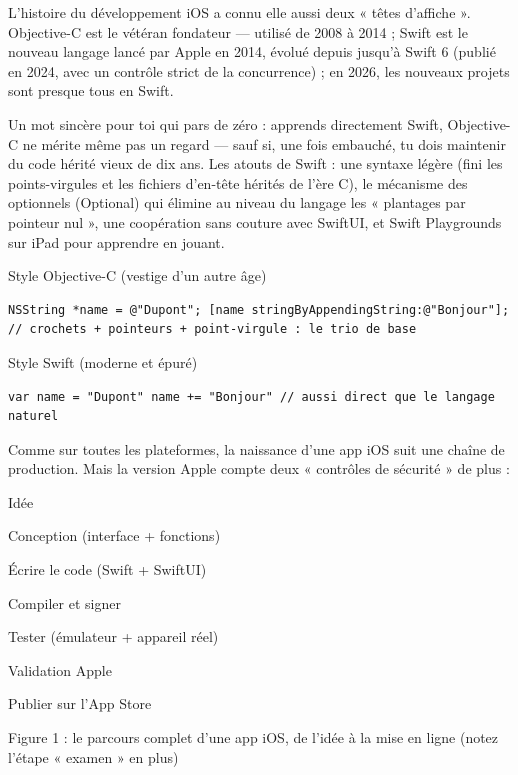 L’histoire du développement iOS a connu elle aussi deux « têtes d’affiche ». Objective-C est le vétéran fondateur — utilisé de 2008 à 2014 ; Swift est le nouveau langage lancé par Apple en 2014, évolué depuis jusqu’à Swift 6 (publié en 2024, avec un contrôle strict de la concurrence) ; en 2026, les nouveaux projets sont presque tous en Swift.

Un mot sincère pour toi qui pars de zéro : apprends directement Swift, Objective-C ne mérite même pas un regard — sauf si, une fois embauché, tu dois maintenir du code hérité vieux de dix ans. Les atouts de Swift : une syntaxe légère (fini les points-virgules et les fichiers d’en-tête hérités de l’ère C), le mécanisme des optionnels (Optional) qui élimine au niveau du langage les « plantages par pointeur nul », une coopération sans couture avec SwiftUI, et Swift Playgrounds sur iPad pour apprendre en jouant.

Style Objective-C (vestige d’un autre âge)

\begin{lstlisting}
NSString *name = @"Dupont"; [name stringByAppendingString:@"Bonjour"]; // crochets + pointeurs + point-virgule : le trio de base
\end{lstlisting}

Style Swift (moderne et épuré)

\begin{lstlisting}
var name = "Dupont" name += "Bonjour" // aussi direct que le langage naturel
\end{lstlisting}


Comme sur toutes les plateformes, la naissance d’une app iOS suit une chaîne de production. Mais la version Apple compte deux « contrôles de sécurité » de plus :

Idée

Conception (interface + fonctions)

Écrire le code (Swift + SwiftUI)

Compiler et signer

Tester (émulateur + appareil réel)

Validation Apple

Publier sur l'App Store

\begin{center}\small\color{gray}Figure 1 : le parcours complet d’une app iOS, de l’idée à la mise en ligne (notez l’étape « examen » en plus)\end{center}

